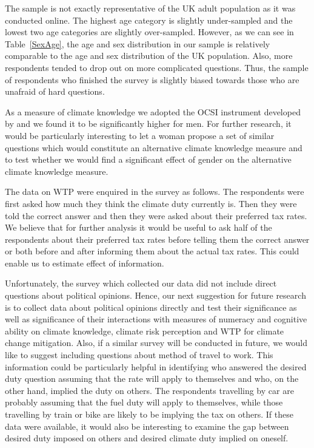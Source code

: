 \documentclass[a4paper,12pt]{article}
\begin{document}
The sample is not exactly representative of the UK adult population as it was conducted online. The highest age category is slightly under-sampled and the lowest two age categories are slightly over-sampled. However, as we can see in Table~\ref{SexAge}, the age and sex distribution in our sample is relatively comparable to the age and sex distribution of the UK population. Also, more respondents tended to drop out on more complicated questions. Thus, the sample of respondents who finished the survey is slightly biased towards those who are unafraid of hard questions.  



As a measure of climate knowledge we adopted the OCSI instrument developed by \citet{Kahan2015} and we found it to be significantly higher for men. For further research, it would be particularly interesting to let a woman propose a set of similar questions which would constitute an alternative climate knowledge measure and to test whether we would find  a significant effect of gender on the alternative climate knowledge measure.




The data on WTP were enquired in the survey as follows. The respondents were first asked how much they think the climate duty currently is. Then they were told the correct answer and then they were asked about their preferred tax rates. We believe that for further analysis it would be useful to ask half of the respondents about their preferred tax rates before telling them the correct answer or both before and after informing them about the actual tax rates. This could enable us to estimate effect of information.


Unfortunately, the survey which collected our data did not include direct questions about political opinions. Hence, our next suggestion for future research is to collect data about political opinions directly and test their significance as well as significance of their interactions with measures of numeracy and cognitive ability on climate knowledge, climate risk perception and WTP for climate change mitigation. Also, if a similar survey will be conducted in future, we would like to suggest including questions about method of travel to work. This information could be particularly helpful in identifying who answered the desired duty question assuming that the rate will apply to themselves and who, on the other hand, implied the duty on others. The respondents travelling by car are probably assuming that the fuel duty will apply to themselves, while those travelling by train or bike are likely to be implying the tax on others. If these data were available, it would also be interesting to examine the gap between desired duty imposed on others and desired climate duty implied on oneself.
\end{document}
